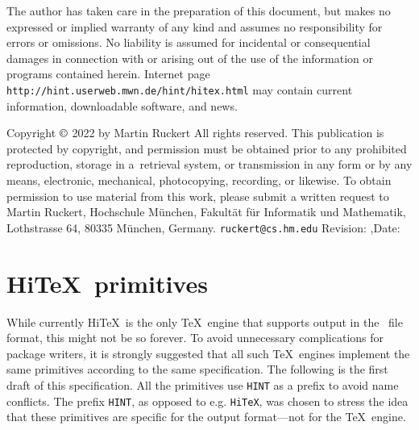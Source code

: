 \titletrue
\begingroup
\figrm
\parindent=0pt

{\raggedright\advance\rightskip 3.5pc 
The author has taken care in the preparation of this document,
but makes no expressed or implied warranty of any kind and assumes no
responsibility for errors or omissions. No liability is assumed for
incidental or consequential damages in connection with or arising out
of the use of the information or programs contained herein.
\bigskip
{\def\:{\discretionary{}{}{}}
Internet page  {\tt http:\://hint.\:userweb.\:mwn.\:de/\:hint/hitex.html}
may contain current information, downloadable software,
and news.}

\vfill
Copyright $\copyright$ 2022 by Martin Ruckert
\smallskip
All rights reserved.
\smallskip
This publication is protected by copyright, and permission must be
obtained prior to any prohibited reproduction, storage in
a~retrieval system, or transmission in any form or by any means, electronic,
mechanical, photocopying, recording, or likewise.
To obtain permission to use material from this work, please submit a written
request to Martin Ruckert,
Hochschule M\"unchen,
Fakult\"at f\"ur Informatik und Mathematik,
Lothstrasse 64,
80335 M\"unchen,
Germany.
\medskip
{\tt ruckert\:@cs.hm.edu}
\medskip
Revision: \lastrevision,\quad Date: \lastdate\par
}
\eject
\endgroup

\frontmatter
{}%

\tableofcontent

\mainmatter

\def\rs{\hskip 2pt plus 3pt minus 2pt\penalty0\relax}
\def\rule#1:#2.{\par{\hangindent32pt\hangafter1\parindent0pt\rightskip 0pt plus 60pt#1{\bf:}\quad%
  \hskip 0pt plus 60pt\penalty-300\hskip 0pt plus -60pt#2{\bf.}\par}}
\def\sym#1{\rs$<${\it #1\/}$>$\rs}
\def\OR{\rs${}\vert{}$\rs}
\def\opt#1{\rs$[{}$#1${}]$\rs}
\def\ctl#1{{\tt\BS #1}}

\section{Hi\TeX\ primitives}

While currently Hi\TeX\ is the only \TeX\ engine that supports output in the \HINT\ file
format, this might not be so forever. To avoid unnecessary complications for 
package writers, it is strongly suggested that all such \TeX\ engines implement
the same primitives according to the same specification. The following is the first
draft of this specification. All the primitives use {\tt HINT} as a prefix to
avoid name conflicts. The prefix {\tt HINT}, as opposed to e.g. {\tt HiTeX},
was chosen to stress the idea that these primitives are specific for the
output format---not for the \TeX\ engine.

